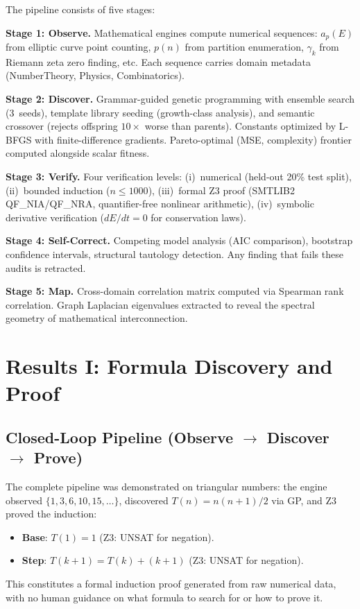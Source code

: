 \documentclass[11pt,a4paper]{article}
\begin{document}
The pipeline consists of five stages:

\textbf{Stage 1: Observe.} Mathematical engines compute numerical
sequences: $a_p(E)$ from elliptic curve point counting, $p(n)$ from
partition enumeration, $\gamma_k$ from Riemann zeta zero finding, etc.
Each sequence carries domain metadata (NumberTheory, Physics,
Combinatorics).

\textbf{Stage 2: Discover.} Grammar-guided genetic programming with
ensemble search (3~seeds), template library seeding (growth-class
analysis), and semantic crossover (rejects offspring $10\times$ worse
than parents). Constants optimized by L-BFGS with finite-difference
gradients. Pareto-optimal (MSE, complexity) frontier computed alongside
scalar fitness.

\textbf{Stage 3: Verify.} Four verification levels:
(i)~numerical (held-out 20\% test split),
(ii)~bounded induction ($n \leq 1000$),
(iii)~formal Z3 proof (SMTLIB2 QF\_NIA/QF\_NRA, quantifier-free
nonlinear arithmetic),
(iv)~symbolic derivative verification ($dE/dt = 0$ for conservation
laws).

\textbf{Stage 4: Self-Correct.} Competing model analysis (AIC
comparison), bootstrap confidence intervals, structural tautology
detection. Any finding that fails these audits is retracted.

\textbf{Stage 5: Map.} Cross-domain correlation matrix computed via
Spearman rank correlation. Graph Laplacian eigenvalues extracted to
reveal the spectral geometry of mathematical interconnection.


\section{Results I: Formula Discovery and Proof}
\label{sec:results1}

\subsection{Closed-Loop Pipeline (Observe $\to$ Discover $\to$ Prove)}

The complete pipeline was demonstrated on triangular numbers: the engine
observed $\{1, 3, 6, 10, 15, \ldots\}$, discovered $T(n) = n(n+1)/2$
via GP, and Z3 proved the induction:
\begin{itemize}
  \item \textbf{Base}: $T(1) = 1$ (Z3: UNSAT for negation).
  \item \textbf{Step}: $T(k+1) = T(k) + (k+1)$ (Z3: UNSAT for negation).
\end{itemize}
This constitutes a formal induction proof generated from raw numerical
data, with no human guidance on what formula to search for or how to
prove it.
\end{document}
